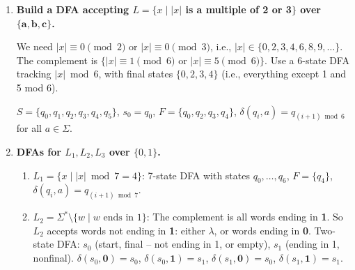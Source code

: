 \documentclass[11pt]{book}
\begin{document}
\begin{enumerate}[{1.}1.]
\item \textbf{Build a DFA accepting $L = \{x \mid |x|$ is a multiple of 2 or 3$\}$ over $\{\mathbf{a},\mathbf{b},\mathbf{c}\}$.}

We need $|x| \equiv 0\pmod{2}$ or $|x|\equiv 0\pmod{3}$, i.e., $|x| \in \{0,2,3,4,6,8,9,\ldots\}$. The complement is $\{|x|\equiv 1\pmod{6}$ or $|x|\equiv 5\pmod{6}\}$. Use a 6-state DFA tracking $|x|\bmod 6$, with final states $\{0,2,3,4\}$ (i.e., everything except 1 and 5 mod 6).

$S = \{q_0,q_1,q_2,q_3,q_4,q_5\}$, $s_0 = q_0$, $F = \{q_0,q_2,q_3,q_4\}$, $\delta(q_i, a) = q_{(i+1)\bmod 6}$ for all $a\in\Sigma$.

\begin{center}
\end{center}

\item \textbf{DFAs for $L_1, L_2, L_3$ over $\{0,1\}$.}

\begin{enumerate}
\item $L_1 = \{x \mid |x|\bmod 7 = 4\}$: 7-state DFA with states $q_0,\ldots,q_6$, $F=\{q_4\}$, $\delta(q_i,a)=q_{(i+1)\bmod 7}$.

\item $L_2 = \Sigma^* \setminus \{w \mid w \text{ ends in }1\}$: The complement is all words ending in \textbf{1}. So $L_2$ accepts words not ending in \textbf{1}: either $\lambda$, or words ending in \textbf{0}. Two-state DFA: $s_0$ (start, final -- not ending in 1, or empty), $s_1$ (ending in 1, nonfinal). $\delta(s_0,\mathbf{0})=s_0$, $\delta(s_0,\mathbf{1})=s_1$, $\delta(s_1,\mathbf{0})=s_0$, $\delta(s_1,\mathbf{1})=s_1$.


\end{enumerate}
\end{enumerate}
\end{document}
